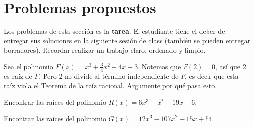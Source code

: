 \section{Problemas propuestos}

Los problemas de esta sección es la \textbf{tarea}.
El estudiante tiene el deber de entregar sus soluciones en la siguiente sesión de clase (también se pueden entregar borradores).
Recordar realizar un trabajo claro, ordenado y limpio.

\begin{multicols}{2}
    \begin{problem}
        Sea el polinomio $F(x) = x^3 + \frac{3}{4}x^2 - 4x - 3$.
        Notemos que $F(2) = 0$, así que 2 es raíz de $F$.
        Pero 2 no divide al término independiente de $F$, es decir que esta raíz viola el Teorema de la raíz racional.
        Argumente por qué pasa esto.
    \end{problem}

    \begin{problem}
        Encontrar las raíces del polinomio $R(x) = 6x^3 + x^2 - 19x + 6$.
    \end{problem}

    \begin{problem}
        Encontrar las raíces del polinomio $G(x) = 12x^3 - 107x^2 - 15x + 54$.
    \end{problem}
\end{multicols}